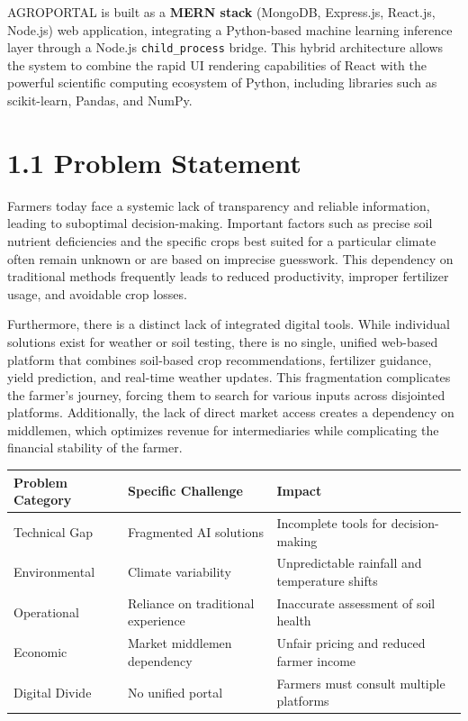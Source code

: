 \documentclass[12pt,a4paper]{report}
\begin{document}
AGROPORTAL is built as a \textbf{MERN stack} (MongoDB, Express.js, React.js, Node.js) web application, integrating a Python-based machine learning inference layer through a Node.js \texttt{child\_process} bridge. This hybrid architecture allows the system to combine the rapid UI rendering capabilities of React with the powerful scientific computing ecosystem of Python, including libraries such as scikit-learn, Pandas, and NumPy.

\section{1.1 Problem Statement}

Farmers today face a systemic lack of transparency and reliable information, leading to suboptimal decision-making. Important factors such as precise soil nutrient deficiencies and the specific crops best suited for a particular climate often remain unknown or are based on imprecise guesswork. This dependency on traditional methods frequently leads to reduced productivity, improper fertilizer usage, and avoidable crop losses.

Furthermore, there is a distinct lack of integrated digital tools. While individual solutions exist for weather or soil testing, there is no single, unified web-based platform that combines soil-based crop recommendations, fertilizer guidance, yield prediction, and real-time weather updates. This fragmentation complicates the farmer's journey, forcing them to search for various inputs across disjointed platforms. Additionally, the lack of direct market access creates a dependency on middlemen, which optimizes revenue for intermediaries while complicating the financial stability of the farmer.

\begin{table}[h!]
\centering
\begin{tabular}{|l|l|l|}
\hline
Problem Category & Specific Challenge & Impact \\ \hline
Technical Gap & Fragmented AI solutions & Incomplete tools for decision-making \\ \hline
Environmental & Climate variability & Unpredictable rainfall and temperature shifts \\ \hline
Operational & Reliance on traditional experience & Inaccurate assessment of soil health \\ \hline
Economic & Market middlemen dependency & Unfair pricing and reduced farmer income \\ \hline
Digital Divide & No unified portal & Farmers must consult multiple platforms \\ \hline
\end{tabular}
\end{table}
\end{document}
